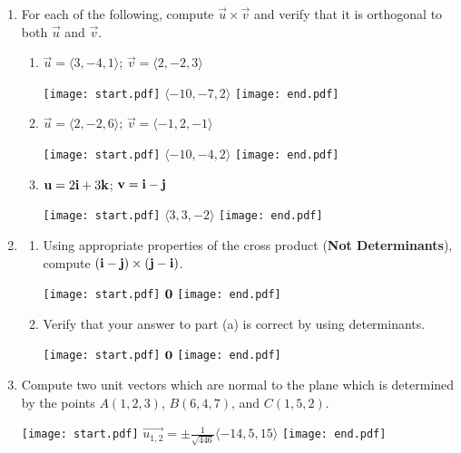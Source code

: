 \documentclass[12pt]{article}
\begin{document}
\begin{enumerate}

\item For each of the following, compute $\overrightarrow{u}\times\overrightarrow{v}$ and verify that it is orthogonal to both $\overrightarrow{u}$ and $\overrightarrow{v}$.

\begin{enumerate}

\item $\overrightarrow{u}=\langle 3,-4,1 \rangle$; $\overrightarrow{v}=\langle 2,-2,3 \rangle$

\texttt{[image: start.pdf]}
{{$\langle -10,-7,2\rangle$}}
\texttt{[image: end.pdf]}


\item $\overrightarrow{u}=\langle 2,-2,6 \rangle$; $\overrightarrow{v}=\langle -1,2,-1 \rangle$

\texttt{[image: start.pdf]}
{{$\langle -10,-4,2\rangle$}}
\texttt{[image: end.pdf]}


\item ${\bf u}=2{\bf i}+3{\bf k}$; ${\bf v}={\bf i}-{\bf j}$

\texttt{[image: start.pdf]}
{{$\langle 3,3,-2\rangle$}}
\texttt{[image: end.pdf]}


\end{enumerate}

\item \begin{enumerate}

\item Using appropriate properties of the cross product ({\bf Not Determinants}), compute $({\bf i}-{\bf j})\times({\bf j}-{\bf i})$.

\texttt{[image: start.pdf]}
{{${\bf 0}$}}
\texttt{[image: end.pdf]}


\item Verify that your answer to part (a) is correct by using determinants.

\texttt{[image: start.pdf]}
{{${\bf 0}$}}
\texttt{[image: end.pdf]}


\end{enumerate}

\item Compute two unit vectors which are normal to the plane which is determined by the points $A(1,2,3)$, $B(6,4,7)$, and $C(1,5,2)$.

\texttt{[image: start.pdf]}
{{$\overrightarrow{u_{1,2}}=\pm\frac{1}{\sqrt{446}}\langle -14,5,15 \rangle$}}
\texttt{[image: end.pdf]}



\end{enumerate}
\end{document}
